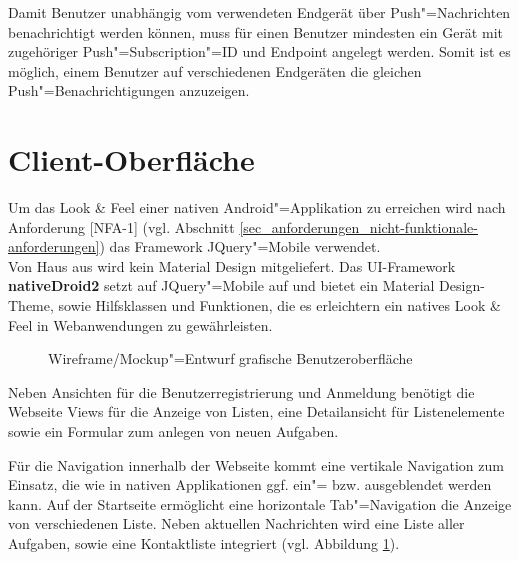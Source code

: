 Damit Benutzer unabhängig vom verwendeten Endgerät über Push"=Nachrichten benachrichtigt werden können, muss für einen Benutzer mindesten ein Gerät mit zugehöriger Push"=Subscription"=ID und Endpoint angelegt werden. Somit ist es möglich, einem Benutzer auf verschiedenen Endgeräten die gleichen Push"=Benachrichtigungen anzuzeigen.

\section{Client-Oberfläche}
\label{sec_konzeption_client-ui}

Um das \glqq{}Look \& Feel\grqq{} einer nativen Android"=Applikation zu erreichen wird nach Anforderung [NFA-1] (vgl. Abschnitt \ref{sec_anforderungen_nicht-funktionale-anforderungen}) das Framework \glqq JQuery"=Mobile\grqq{} verwendet.\\
Von Haus aus wird kein \glqq Material Design\grqq{} mitgeliefert. Das UI-Framework \textbf{nativeDroid2} setzt auf \glqq JQuery"=Mobile\grqq{} auf und bietet ein \glqq Material Design\grqq{}-Theme, sowie Hilfsklassen und Funktionen, die es erleichtern ein natives \glqq{}Look \& Feel\grqq{} in Webanwendungen zu gewährleisten. \\

\begin{figure}[htp] 
\caption{Wireframe/Mockup"=Entwurf grafische Benutzeroberfläche}
\label{image_konzeption_gui}
\end{figure} 

Neben Ansichten für die Benutzerregistrierung und Anmeldung benötigt die Webseite Views für die Anzeige von Listen, eine Detailansicht für Listenelemente sowie ein Formular zum anlegen von neuen Aufgaben. 

Für die Navigation innerhalb der Webseite kommt eine vertikale Navigation zum Einsatz, die wie in nativen Applikationen ggf. ein"= bzw. ausgeblendet werden kann. Auf der Startseite ermöglicht eine horizontale Tab"=Navigation die Anzeige von verschiedenen Liste. Neben aktuellen Nachrichten wird eine Liste aller Aufgaben, sowie eine Kontaktliste integriert (vgl. Abbildung \ref{image_konzeption_gui}). 
